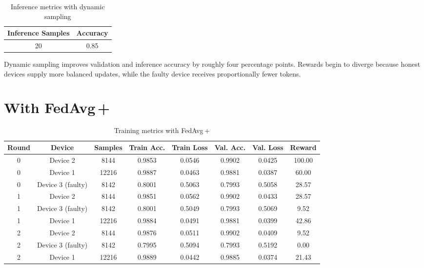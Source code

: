 \begin{table}[h!]
    \centering
    \caption{Inference metrics with dynamic sampling}
    \label{tab:dynamic_inference}
    \begin{tabular}{c c}
        \toprule
        \textbf{Inference Samples} & \textbf{Accuracy} \\
        \midrule
        20 & 0.85 \\
        \bottomrule
    \end{tabular}
\end{table}

Dynamic sampling improves validation and inference accuracy by roughly four percentage points. Rewards begin to diverge because honest devices supply more balanced updates, while the faulty device receives proportionally fewer tokens.

\section{With FedAvg\,+ }

\begin{table}[h!]
    \centering
    \caption{Training metrics with FedAvg\,+}
    \label{tab:fedavg_plus}
    \begin{tabular}{c c c c c c c c}
        \toprule
        \textbf{Round} & \textbf{Device} & \textbf{Samples} & \textbf{Train Acc.} & \textbf{Train Loss} & \textbf{Val. Acc.} & \textbf{Val. Loss} & \textbf{Reward} \\
        \midrule
        0 & Device 2 & 8144 & 0.9853 & 0.0546 & 0.9902 & 0.0425 & 100.00 \\
        0 & Device 1 & 12216 & 0.9887 & 0.0463 & 0.9881 & 0.0387 & 60.00 \\
        0 & Device 3 (faulty) & 8142 & 0.8001 & 0.5063 & 0.7993 & 0.5058 & 28.57 \\
        1 & Device 2 & 8144 & 0.9851 & 0.0562 & 0.9902 & 0.0433 & 28.57 \\
        1 & Device 3 (faulty) & 8142 & 0.8001 & 0.5049 & 0.7993 & 0.5069 & 9.52 \\
        1 & Device 1 & 12216 & 0.9884 & 0.0491 & 0.9881 & 0.0399 & 42.86 \\
        2 & Device 2 & 8144 & 0.9876 & 0.0511 & 0.9902 & 0.0409 & 9.52 \\
        2 & Device 3 (faulty) & 8142 & 0.7995 & 0.5094 & 0.7993 & 0.5192 & 0.00 \\
        2 & Device 1 & 12216 & 0.9889 & 0.0442 & 0.9885 & 0.0374 & 21.43 \\
        \bottomrule
    \end{tabular}
\end{table}

